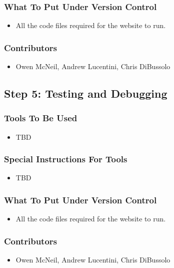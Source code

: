 \documentclass[12pt, titlepage]{article}
\begin{document}
\subsubsection*{What To Put Under Version Control}
\begin{itemize}
        \item All the code files required for the website to run.
\end{itemize}
\subsubsection*{Contributors}
\begin{itemize}
        \item Owen McNeil, Andrew Lucentini, Chris DiBussolo
\end{itemize}

\subsection{Step 5: Testing and Debugging}
\subsubsection*{Tools To Be Used}
\begin{itemize}
        \item TBD
\end{itemize}
\subsubsection*{Special Instructions For Tools}
\begin{itemize}
        \item TBD
\end{itemize}
\subsubsection*{What To Put Under Version Control}
\begin{itemize}
        \item All the code files required for the website to run.
\end{itemize}
\subsubsection*{Contributors}
\begin{itemize}
        \item Owen McNeil, Andrew Lucentini, Chris DiBussolo
\end{itemize}
\end{document}
